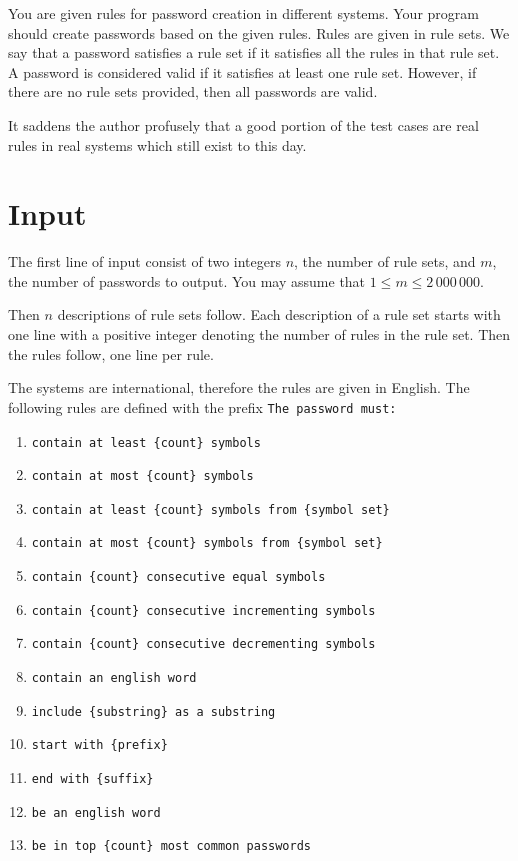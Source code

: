 You are given rules for password creation in different systems.
Your program should create passwords based on the given rules.
Rules are given in rule sets.
We say that a password satisfies a rule set if it satisfies all the rules in that rule set.
A password is considered valid if it satisfies at least one rule set.
However, if there are no rule sets provided, then all passwords are valid.

It saddens the author profusely that a good portion of the test cases are real rules in real systems which still exist to this day.

\section*{Input}
The first line of input consist of two integers $n$, the number of rule sets, and $m$, the number of passwords to output.
You may assume that $1 \leq m \leq 2\,000\,000$.

Then $n$ descriptions of rule sets follow.
Each description of a rule set starts with one line with a positive integer denoting the number of rules in the rule set.
Then the rules follow, one line per rule.

The systems are international, therefore the rules are given in English.
The following rules are defined with the prefix \texttt{The password must:}
\begin{enumerate}
    \item \texttt{contain at least \{count\} symbols}
    \item \texttt{contain at most \{count\} symbols}
    \item \texttt{contain at least \{count\} symbols from \{symbol set\}}
    \item \texttt{contain at most \{count\} symbols from \{symbol set\}}
    \item \texttt{contain \{count\} consecutive equal symbols}
    \item \texttt{contain \{count\} consecutive incrementing symbols}
    \item \texttt{contain \{count\} consecutive decrementing symbols}
    \item \texttt{contain an english word}
    \item \texttt{include \{substring\} as a substring}
    \item \texttt{start with \{prefix\}}
    \item \texttt{end with \{suffix\}}
    \item \texttt{be an english word}
    \item \texttt{be in top \{count\} most common passwords}
\end{enumerate}

